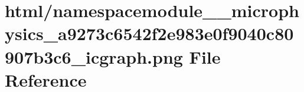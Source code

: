 \hypertarget{namespacemodule____microphysics__a9273c6542f2e983e0f9040c80907b3c6__icgraph_8png}{}\section{html/namespacemodule\+\_\+\+\_\+microphysics\+\_\+a9273c6542f2e983e0f9040c80907b3c6\+\_\+icgraph.png File Reference}
\label{namespacemodule____microphysics__a9273c6542f2e983e0f9040c80907b3c6__icgraph_8png}
